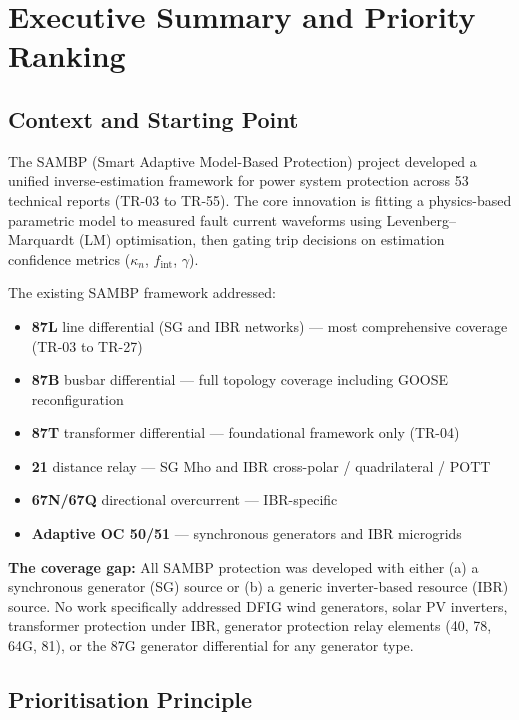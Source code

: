 \documentclass[12pt, a4paper]{report}
\begin{document}
\chapter{Executive Summary and Priority Ranking}

\section{Context and Starting Point}

The SAMBP (Smart Adaptive Model-Based Protection) project developed a unified inverse-estimation framework for power system protection across 53 technical reports (TR-03 to TR-55). The core innovation is fitting a physics-based parametric model to measured fault current waveforms using Levenberg--Marquardt (LM) optimisation, then gating trip decisions on estimation confidence metrics ($\kappa_n$, $f_\mathrm{int}$, $\gamma$).

\medskip
The existing SAMBP framework addressed:
\begin{itemize}[nosep]
  \item \textbf{87L} line differential (SG and IBR networks) — most comprehensive coverage (TR-03 to TR-27)
  \item \textbf{87B} busbar differential — full topology coverage including GOOSE reconfiguration
  \item \textbf{87T} transformer differential — foundational framework only (TR-04)
  \item \textbf{21} distance relay — SG Mho and IBR cross-polar / quadrilateral / POTT
  \item \textbf{67N/67Q} directional overcurrent — IBR-specific
  \item \textbf{Adaptive OC 50/51} — synchronous generators and IBR microgrids
\end{itemize}

\begin{tcolorbox}[notebox, title={}]
\textbf{The coverage gap:} All SAMBP protection was developed with either (a) a synchronous generator (SG) source or (b) a generic inverter-based resource (IBR) source. No work specifically addressed DFIG wind generators, solar PV inverters, transformer protection under IBR, generator protection relay elements (40, 78, 64G, 81), or the 87G generator differential for any generator type.
\end{tcolorbox}

\section{Prioritisation Principle}
\end{document}

